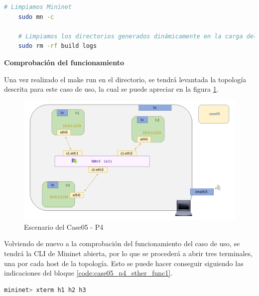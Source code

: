 \begin{lstlisting}[language= bash, style=Consola, caption={Limpieza segura del escenario P4 - Case04},label=code:case05_p4_ether_unload2]
    # Limpiamos Mininet
    sudo mn -c
    
    # Limpiamos los directorios generados dinámicamente en la carga del escenario
    sudo rm -rf build logs
\end{lstlisting}


\vspace{0.5cm}
\textbf{Comprobación del funcionamiento}\\
\par
Una vez realizado el make run en el directorio, se tendrá levantada la topología descrita para este caso de uso, la cual se puede apreciar en la figura \ref{fig:case05_p4_ether_scenario}.


\begin{figure}[ht]
    \centering
    \includegraphics[width=16cm]{archivos/img/dev/p4/case05/scenario.png}
    \caption{Escenario del Case05 - P4}
    \label{fig:case05_p4_ether_scenario}
\end{figure}

Volviendo de nuevo a la comprobación del funcionamiento del caso de uso, se tendrá la CLI de Mininet abierta, por lo que se procederá a abrir tres terminales, una por cada host de la topología. Esto se puede hacer conseguir siguiendo las indicaciones del bloque \ref{code:case05_p4_ether_func1}.

\begin{lstlisting}[language= bash, style=Consola, caption={Apertura de terminales - Case05},label=code:case05_p4_ether_func1]
    mininet> xterm h1 h2 h3 
\end{lstlisting}
\vspace{0.5cm}

